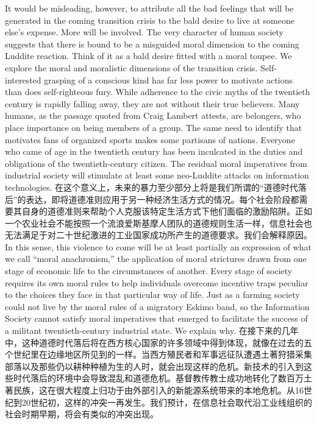 \begin{paracol}{2}[]
It would be misleading, however, to attribute all the bad feelings that will be generated in the coming transition crisis to the bald desire to live at someone else's expense. More will be involved. The very character of human society suggests that there is bound to be a misguided moral dimension to the coming Luddite reaction. Think of it as a bald desire fitted with a moral toupee. We explore the moral and moralistic dimensions of the transition crisis. Self-interested grasping of a conscious kind has far less power to motivate actions than does self-righteous fury. While adherence to the civic myths of the twentieth century is rapidly falling away, they are not without their true believers. Many humans, as the passage quoted from Craig Lambert attests, are belongers, who place importance on being members of a group. The same need to identify that motivates fans of organized sports makes some partisans of nations. Everyone who came of age in the twentieth century has been inculcated in the duties and obligations of the twentieth-century citizen. The residual moral imperatives from industrial society will stimulate at least some neo-Luddite attacks on information technologies.
\switchcolumn*
在这个意义上，未来的暴力至少部分上将是我们所谓的“道德时代落后”的表达，即将道德准则应用于另一种经济生活方式的情况。每个社会阶段都需要其自身的道德准则来帮助个人克服该特定生活方式下他们面临的激励陷阱。正如一个农业社会不能按照一个流浪爱斯基摩人团队的道德规则生活一样，信息社会也无法满足于对二十世纪激进的工业国家成功所产生的道德要求。我们会解释原因。
\switchcolumn
In this sense, this violence to come will be at least partially an expression of what we call ``moral anachronism,'' the application of moral strictures drawn from one stage of economic life to the circumstances of another. Every stage of society requires its own moral rules to help individuals overcome incentive traps peculiar to the choices they face in that particular way of life. Just as a farming society could not live by the moral rules of a migratory Eskimo band, so the Information Society cannot satisfy moral imperatives that emerged to facilitate the success of a militant twentieth-century industrial state. We explain why.
\switchcolumn*
在接下来的几年中，这种道德时代落后将在西方核心国家的许多领域中得到体现，就像在过去的五个世纪里在边缘地区所见到的一样。当西方殖民者和军事远征队遭遇土著狩猎采集部落以及那些仍以耕种种植为生的人时，就会出现这样的危机。新技术的引入到这些时代落后的环境中会导致混乱和道德危机。基督教传教士成功地转化了数百万土著民族，这在很大程度上归功于由外部引入的新能源系统带来的本地危机。从16世纪到20世纪初，这样的冲突一再发生。我们预计，在信息社会取代沿工业线组织的社会时期早期，将会有类似的冲突出现。

\end{paracol}
